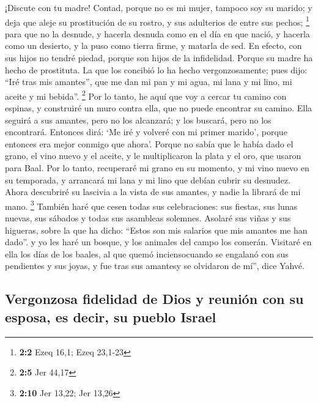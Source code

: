  ¡Discute con tu madre! Contad, porque no es mi mujer,
tampoco soy su marido; y deja que aleje su prostitución de su rostro, y
sus adulterios de entre sus pechos; \footnote{\textbf{2:2} Ezeq 16,1;
  Ezeq 23,1-23}  para que no la desnude, y hacerla desnuda
como en el día en que nació, y hacerla como un desierto, y la puso como
tierra firme, y matarla de sed.  En efecto, con sus hijos
no tendré piedad, porque son hijos de la infidelidad. 
Porque su madre ha hecho de prostituta. La que los concibió lo ha hecho
vergonzosamente; pues dijo: ``Iré tras mis amantes'', que me dan mi pan
y mi agua, mi lana y mi lino, mi aceite y mi bebida''. \footnote{\textbf{2:5}
  Jer 44,17}  Por lo tanto, he aquí que voy a cercar tu
camino con espinas, y construiré un muro contra ella, que no puede
encontrar su camino.  Ella seguirá a sus amantes, pero no
los alcanzará; y los buscará, pero no los encontrará. Entonces dirá: `Me
iré y volveré con mi primer marido', porque entonces era mejor conmigo
que ahora'.  Porque no sabía que le había dado el grano,
el vino nuevo y el aceite, y le multiplicaron la plata y el oro, que
usaron para Baal.  Por lo tanto, recuperaré mi grano en su
momento, y mi vino nuevo en su temporada, y arrancará mi lana y mi lino
que debían cubrir su desnudez.  Ahora descubriré su
lascivia a la vista de sus amantes, y nadie la librará de mi mano.
\footnote{\textbf{2:10} Jer 13,22; Jer 13,26}  También
haré que cesen todas sus celebraciones: sus fiestas, sus lunas nuevas,
sus sábados y todas sus asambleas solemnes.  Asolaré sus
viñas y sus higueras, sobre la que ha dicho: ``Estos son mis salarios
que mis amantes me han dado''. y yo les haré un bosque, y los animales
del campo los comerán.  Visitaré en ella los días de los
baales, al que quemó inciensocuando se engalanó con sus pendientes y sus
joyas, y fue tras sus amantesy se olvidaron de mí'', dice Yahvé.

\hypertarget{vergonzosa-fidelidad-de-dios-y-reuniuxf3n-con-su-esposa-es-decir-su-pueblo-israel}{%
\subsection{Vergonzosa fidelidad de Dios y reunión con su esposa, es
decir, su pueblo
Israel}\label{vergonzosa-fidelidad-de-dios-y-reuniuxf3n-con-su-esposa-es-decir-su-pueblo-israel}}

